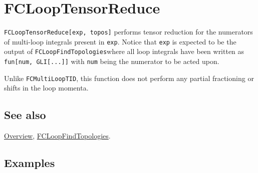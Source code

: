 \documentclass[../FeynCalcManual.tex]{subfiles}
\begin{document}
\hypertarget{fclooptensorreduce}{
\section{FCLoopTensorReduce}\label{fclooptensorreduce}}

\texttt{FCLoopTensorReduce[\allowbreak{}exp,\ \allowbreak{}topos]}
performs tensor reduction for the numerators of multi-loop integrals
present in \texttt{exp}. Notice that \texttt{exp} is expected to be the
output of \texttt{FCLoopFindTopologies}where all loop integrals have
been written as
\texttt{fun[\allowbreak{}num,\ \allowbreak{}GLI[\allowbreak{}...]]} with
\texttt{num} being the numerator to be acted upon.

Unlike \texttt{FCMultiLoopTID}, this function does not perform any
partial fractioning or shifts in the loop momenta.

\subsection{See also}

\hyperlink{toc}{Overview},
\hyperlink{fcloopfindtopologies}{FCLoopFindTopologies}.

\subsection{Examples}

\begin{Shaded}
\begin{Highlighting}[]
\OperatorTok{[}\OperatorTok{[}\OperatorTok{,} \SpecialCharTok{\textbackslash{}}\OperatorTok{[}\OperatorTok{]]}\OperatorTok{[}\OperatorTok{,} \SpecialCharTok{\textbackslash{}}\OperatorTok{[}\OperatorTok{]]}\OperatorTok{[}\OperatorTok{,}\OperatorTok{,} \OperatorTok{\{}\SpecialCharTok{{-}}\OperatorTok{\},} \OperatorTok{\{}\SpecialCharTok{{-}}\OperatorTok{\},} \OperatorTok{\{}\SpecialCharTok{{-}}\OperatorTok{\}]]} 
 
\OperatorTok{[}\SpecialCharTok{\%}\OperatorTok{,} \OperatorTok{\{}\OperatorTok{,}\OperatorTok{\}]}
\end{Highlighting}
\end{Shaded}
\end{document}
